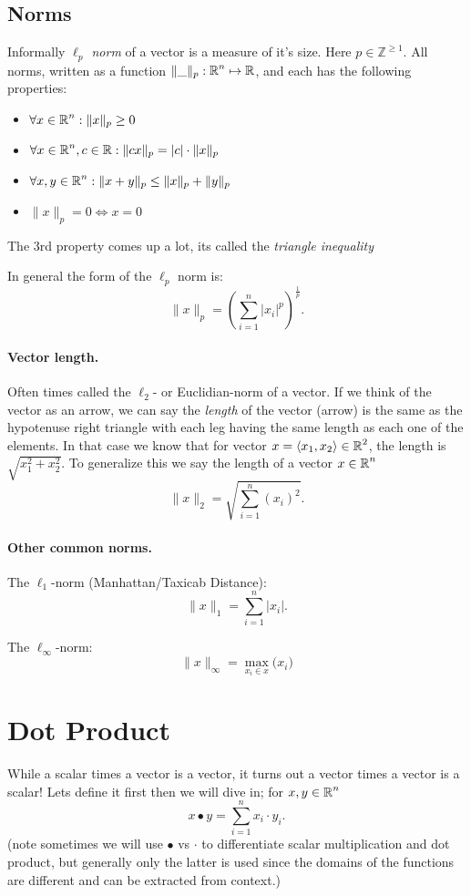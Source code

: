 \subsection{Norms}
Informally \emph{$\ell_p$ norm} of a vector is a measure of it's size.
Here $p\in\mathbb{Z}^{\ge1}$.  
All norms, written as a function $\|\_\|_p: \operatorname{\mathbb{R}}^n \mapsto \operatorname{\mathbb{R}}$, and each has the following properties:
\begin{itemize}
\item $\forall x \in \operatorname{\mathbb{R}}^n : \|x\|_p\ge 0$
\item $\forall x \in \operatorname{\mathbb{R}}^n, c\in\operatorname{\mathbb{R}} : \|cx\|_p = |c|\cdot\|x\|_p$ 
\item $\forall x,y \in \operatorname{\mathbb{R}}^n : \|x+y\|_p\le \|x\|_p + \|y\|_p$
\item $\|x\|_p = 0 \iff x=0$
\end{itemize}

The 3rd property comes up a lot, its called the \emph{triangle inequality}

In general the form of the $\ell_p$ norm is:
\[
\|x\|_p = \left(\sum_{i=1}^n \left|x_i\right|^p\right)^{\frac{1}{p}}.
\]



\paragraph{Vector length.} Often times called the $\ell_2$- or Euclidian-norm of a vector. 
If we think of the vector as an arrow, we can say the \emph{length} of the vector (arrow) is the same as the hypotenuse 
right triangle with each leg having the same length as each one of the elements. 
In that case we know that for vector $x = \left\langle x_1,x_2\right\rangle\in\operatorname{\mathbb{R}}^2$, the length is $\sqrt{x_1^2 + x_2^2}$.
To generalize this we say the length of a vector $x\in\operatorname{\mathbb{R}}^n$
\[
\|x\|_2 = \sqrt{\sum_{i=1}^n \left(x_i\right)^2}.
\]

\paragraph{Other common norms.}
The $\ell_1$-norm (Manhattan/Taxicab Distance):
\[
\|x\|_1 = \sum_{i=1}^n \left|x_i\right|.
\]

The $\ell_\infty$-norm: 
\[
\|x\|_\infty = \max_{x_i \in x} \big(x_i\big)
\]


\section{Dot Product}
While a scalar times a vector is a vector, it turns out a vector times a vector is a scalar! 
Lets define it first then we will dive in;
for $x,y \in \operatorname{\mathbb{R}}^n$
\[
x \bullet y = \sum_{i=1}^n x_i \cdot y_i.
\]
(note sometimes we will use $\bullet$ vs $\cdot$ to differentiate scalar multiplication and dot product, but generally only the latter is used since the domains of the functions are different and can be extracted from context.)

